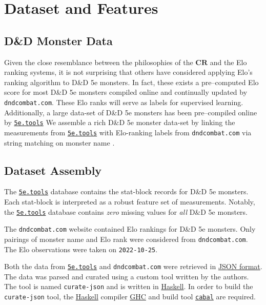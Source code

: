 \documentclass{article}
\newcommand{\Qty}[1]{\oldstylenums{#1}}
\newcommand{\CR}{\ensuremath{\mathbf{CR}}\xspace}
\newcommand{\DnD}{D\&D 5e\xspace}
\newcommand{\FiveETools}{\href{https://5etools-mirror-1.github.io/}{\texttt{5e.tools}}\xspace}
\newcommand{\DnDCombat}{\texttt{dndcombat.com}\xspace}
\begin{document}
\section{Dataset and Features}

\hypertarget{the-dd-monster-data}{%
	\subsection{D\&D Monster Data}\label{the-dd-monster-data}}

Given the close resemblance between the philosophies of the \CR and the Elo ranking systems, it is not surprising that others have considered applying Elo's ranking algorithm to \DnD monsters.
In fact, these exists a pre--computed Elo score for most \DnD monsters compiled online and continually updated by \DnDCombat \cite{DnDCombat}.
These Elo ranks will serve as labels for supervised learning.
Additionally, a large data-set of \DnD monsters has been pre--compiled online by \FiveETools \cite{Mirror5eTools}
We assemble a rich \DnD monster data-set by linking the measurements from \FiveETools with Elo-ranking labels from \DnDCombat via string matching on monster name .


\hypertarget{datset-assembly}{%
\subsection{Dataset Assembly}\label{datset-assembly}}

The \FiveETools database contains the stat-block records for \Qty{2,333} \DnD monsters.
Each stat-block is interpreted as a robust feature set of \Qty{71} measurements.
Notably, the \FiveETools database contains \emph{zero} missing values for \emph{all} \Qty{2,333} \DnD monsters.

The \DnDCombat website contained Elo rankings for \Qty{2,936} \DnD monsters.
Only pairings of monster name and Elo rank were considered from \DnDCombat.
The Elo observations were taken on \texttt{2022-10-25}.


Both the data from \FiveETools and \DnDCombat were retrieved in \href{https://en.wikipedia.org/wiki/JSON}{JSON format}.
The data was parsed and curated using a custom tool written by the authors.
The tool is named \texttt{curate-json} and is written in \href{https://www.haskell.org/}{Haskell}.
In order to build the \texttt{curate-json} tool, the \href{https://www.haskell.org/}{Haskell} compiler \href{https://www.haskell.org/ghc/download.html}{GHC} and build tool \href{https://www.haskell.org/cabal/download.html}{\texttt{cabal}}
are required. 
\end{document}
